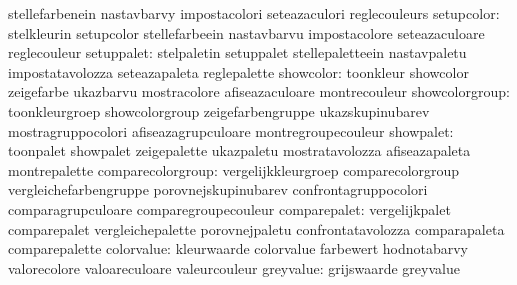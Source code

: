                                   stellefarbenein                  nastavbarvy
                                  impostacolori                    seteazaculori
                                  reglecouleurs
                      setupcolor: stelkleurin                      setupcolor
                                  stellefarbeein                   nastavbarvu
                                  impostacolore                    seteazaculoare
                                  reglecouleur
                      setuppalet: stelpaletin                      setuppalet
                                  stellepaletteein                 nastavpaletu
                                  impostatavolozza                 seteazapaleta
                                  reglepalette
                       showcolor: toonkleur                        showcolor
                                  zeigefarbe                       ukazbarvu
                                  mostracolore                     afiseazaculoare
                                  montrecouleur
                  showcolorgroup: toonkleurgroep                   showcolorgroup
                                  zeigefarbengruppe                ukazskupinubarev
                                  mostragruppocolori               afiseazagrupculoare
                                  montregroupecouleur
                       showpalet: toonpalet                        showpalet
                                  zeigepalette                     ukazpaletu
                                  mostratavolozza                  afiseazapaleta
                                  montrepalette
               comparecolorgroup: vergelijkkleurgroep              comparecolorgroup
                                  vergleichefarbengruppe           porovnejskupinubarev
                                  confrontagruppocolori            comparagrupculoare
                                  comparegroupecouleur
                    comparepalet: vergelijkpalet                   comparepalet
                                  vergleichepalette                porovnejpaletu
                                  confrontatavolozza               comparapaleta
                                  comparepalette
                      colorvalue: kleurwaarde                      colorvalue
                                  farbewert                        hodnotabarvy
                                  valorecolore                     valoareculoare
                                  valeurcouleur
                       greyvalue: grijswaarde                      greyvalue
